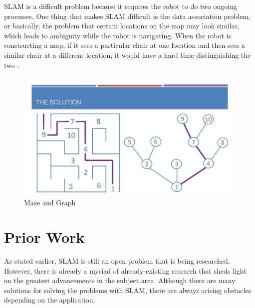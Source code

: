 \documentclass[10pt,twocolumn]{article}
\begin{document}
SLAM is a difficult problem because it requires the robot to do two ongoing processes. One thing that makes SLAM difficult is the data association problem, or basically, the problem that certain locations on the map may look similar, which leads to ambiguity while the robot is navigating. When the robot is constructing a map, if it sees a particular chair at one location and then sees a similar chair at a different location, it would have a hard time distinguishing the two \textcite{Mataric2008TheRoboticsPrimer}.

\begin{figure}
    \centering
    \includegraphics[width=.95\linewidth]{graph.jpg}
    \caption{
        Maze and Graph
    }
    \label{fig:Figure1}
\end{figure}



\section{Prior Work}

As stated earlier, SLAM is still an open problem that is being researched. However, there is already a myriad of already-existing research that sheds light on the greatest advancements in the subject area. Although there are many solutions for solving the problems with SLAM, there are always arising obstacles depending on the application.
\end{document}
